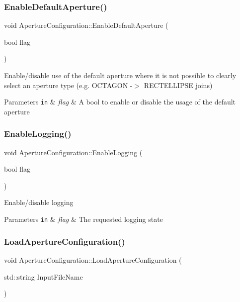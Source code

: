 \subsubsection{\texorpdfstring{Enable\+Default\+Aperture()}{EnableDefaultAperture()}}
{\footnotesize\ttfamily void Aperture\+Configuration\+::\+Enable\+Default\+Aperture (\begin{DoxyParamCaption}\item[{bool}]{flag }\end{DoxyParamCaption})}

Enable/disable use of the default aperture where it is not possible to clearly select an aperture type (e.\+g. O\+C\+T\+A\+G\+ON -\/$>$ R\+E\+C\+T\+E\+L\+L\+I\+P\+SE joins) 
\begin{DoxyParams}[1]{Parameters}
\mbox{\tt in}  & {\em flag} & A bool to enable or disable the usage of the default aperture \\
\hline
\end{DoxyParams}
\mbox{\label{classApertureConfiguration_acbb9431d139a07249cf0487f8fd4753b}} 
\subsubsection{\texorpdfstring{Enable\+Logging()}{EnableLogging()}}
{\footnotesize\ttfamily void Aperture\+Configuration\+::\+Enable\+Logging (\begin{DoxyParamCaption}\item[{bool}]{flag }\end{DoxyParamCaption})}

Enable/disable logging 
\begin{DoxyParams}[1]{Parameters}
\mbox{\tt in}  & {\em flag} & The requested logging state \\
\hline
\end{DoxyParams}
\mbox{\label{classApertureConfiguration_a23e6989301d2c88027decc4c6cf63049}} 
\subsubsection{\texorpdfstring{Load\+Aperture\+Configuration()}{LoadApertureConfiguration()}}
{\footnotesize\ttfamily void Aperture\+Configuration\+::\+Load\+Aperture\+Configuration (\begin{DoxyParamCaption}\item[{std\+::string}]{Input\+File\+Name }\end{DoxyParamCaption})}

